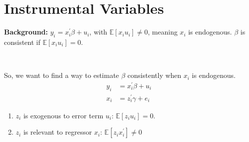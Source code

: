\section{Instrumental Variables}

\textbf{Background:} $y_i = x_i^{\prime} \beta + u_i$, with $\mathbb{E}[x_i u_i] \neq 0$, meaning $x_i$ is endogenous.
$\beta$ is consistent if $\mathbb{E}[x_i u_i] = 0$.

\begin{eg}
    \

    So, we want to find a way to estimate $\beta$ consistently when $x_i$ is endogenous.
    \begin{align*}
        y_i &= x_i^{\prime} \beta + u_i \\
        x_i &= z_i^{\prime} \gamma + e_i
    \end{align*}

    \begin{enumerate}
        \item $z_i$ is exogenous to error term $u_i$: $\mathbb{E}[z_i u_i] = 0$.
        \item $z_i$ is relevant to regressor $x_i$: $\mathbb{E}[z_i x_i^{\prime} ] \neq 0$
    \end{enumerate}


\end{eg}
